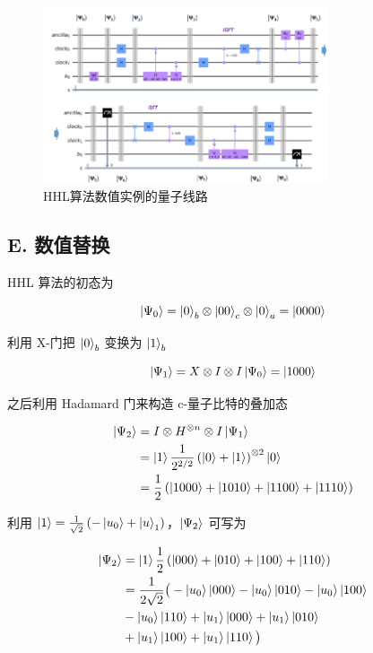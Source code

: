 \documentclass[aps,prl,twocolumn,groupedaddress]{revtex4-2}
\begin{document}
\begin{figure}[htbp]
    \centering
    \includegraphics[width=0.75\textwidth]{fig/fig3.png}
    \caption{HHL算法数值实例的量子线路}
    \label{fig3}
\end{figure}

\subsection{E. 数值替换}

HHL 算法的初态为

$$
\ket{\Psi_0}=\ket{0}_b\otimes\ket{00}_c\otimes\ket{0}_a=\ket{0000}
$$

利用 X-门把 $\ket{0}_b$ 变换为 $\ket{1}_b$

$$
\ket{\Psi_1} = X\otimes I\otimes I\ket{\Psi_0} = \ket{1000}
$$

之后利用 Hadamard 门来构造 c-量子比特的叠加态

$$
\begin{aligned}
\ket{\Psi_2}
&=I\otimes H^{\otimes n}\otimes I \ket{\Psi_1} \\
&=\ket{1}\frac{1 }{2^{2/2} } \left(\ket{0}+\ket{1} \right)^{\otimes 2}\ket{0} \\
&=\frac{1 }{2 } \left(\ket{1000}+\ket{1010}+\ket{1100}+\ket{1110} \right)
\end{aligned}
$$

利用 $\ket{1}=\frac{1 }{\sqrt{2} } \left(-\ket{u_0}+\ket{u}_1 \right)$，$\ket{\Psi_2}$ 可写为

$$
\begin{aligned}
\ket{\Psi_2}
&=\ket{1}\frac{1 }{2 } \left(\ket{000}+\ket{010}+\ket{100}+\ket{110} \right) \\
&=\frac{1 }{2\sqrt{2} } \big(-\ket{u_0}\ket{000}-\ket{u_0}\ket{010}-\ket{u_0}\ket{100} \\
&-\ket{u_0}\ket{110}+\ket{u_1}\ket{000}+\ket{u_1}\ket{010} \\
&+\ket{u_1}\ket{100}+\ket{u_1}\ket{110}\big)
\end{aligned}
$$
\end{document}
